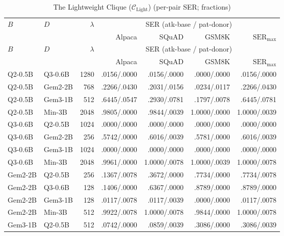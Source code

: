 \documentclass{article}
\theoremstyle{plain}
\theoremstyle{definition}
\theoremstyle{remark}
\begin{document}
\begingroup
\small
\setlength{\tabcolsep}{3pt}
\begin{longtable}{@{}llrrrrr@{}}
\caption{The Lightweight Clique ($\mathcal{C}_{\text{Light}}$) (per-pair SER; fractions)}\label{tab:app:small-bidirectional:ser}\\
\toprule
$B$ & $D$ & $\lambda$ & \multicolumn{4}{c}{SER (atk-base / pat-donor)} \\
\cmidrule(lr){4-7}
 &  &  & Alpaca & SQuAD & GSM8K & $\mathrm{SER}_{\max}$ \\
\midrule
\endfirsthead
\toprule
$B$ & $D$ & $\lambda$ & \multicolumn{4}{c}{SER (atk-base / pat-donor)} \\
\cmidrule(lr){4-7}
 &  &  & Alpaca & SQuAD & GSM8K & $\mathrm{SER}_{\max}$ \\
\midrule
\endhead
\bottomrule
\endfoot
\rowcolor{rowPI} Q2-0.5B & Q3-0.6B & 1280 & .0156/.0000 & .0156/.0000 & .0000/.0000 & .0156/.0000 \\
\rowcolor{rowPI} Q2-0.5B & Gem2-2B & 768 & .2266/.0430 & .2031/.0156 & .0234/.0117 & .2266/.0430 \\
\rowcolor{rowPI} Q2-0.5B & Gem3-1B & 512 & .6445/.0547 & .2930/.0781 & .1797/.0078 & .6445/.0781 \\
\rowcolor{rowPI} Q2-0.5B & Min-3B & 2048 & .9805/.0000 & .9844/.0039 & 1.0000/.0000 & 1.0000/.0039 \\
\rowcolor{rowIP} Q3-0.6B & Q2-0.5B & 1024 & .0000/.0000 & .0000/.0000 & .0000/.0000 & .0000/.0000 \\
\rowcolor{rowII} Q3-0.6B & Gem2-2B & 256 & .5742/.0000 & .6016/.0039 & .5781/.0000 & .6016/.0039 \\
\rowcolor{rowII} Q3-0.6B & Gem3-1B & 1024 & .0000/.0000 & .0000/.0000 & .0000/.0000 & .0000/.0000 \\
\rowcolor{rowII} Q3-0.6B & Min-3B & 2048 & .9961/.0000 & 1.0000/.0078 & 1.0000/.0039 & 1.0000/.0078 \\
\rowcolor{rowIP} Gem2-2B & Q2-0.5B & 256 & .1367/.0078 & .3672/.0000 & .7734/.0000 & .7734/.0078 \\
\rowcolor{rowII} Gem2-2B & Q3-0.6B & 128 & .1406/.0000 & .6367/.0000 & .8789/.0000 & .8789/.0000 \\
\rowcolor{rowII} Gem2-2B & Gem3-1B & 128 & .0117/.0078 & .0117/.0039 & .0000/.0000 & .0117/.0078 \\
\rowcolor{rowII} Gem2-2B & Min-3B & 512 & .9922/.0078 & 1.0000/.0078 & .9844/.0000 & 1.0000/.0078 \\
\rowcolor{rowIP} Gem3-1B & Q2-0.5B & 512 & .0742/.0000 & .0859/.0039 & .3086/.0000 & .3086/.0039 \\

\end{longtable}
\end{document}
